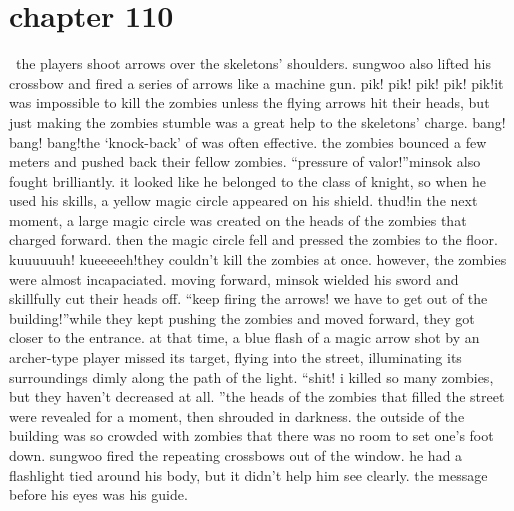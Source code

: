 \section{chapter 110}






 the players shoot arrows over the skeletons’ shoulders.
 sungwoo also lifted his crossbow and fired a series of arrows like a machine gun.
pik! pik! pik! pik! pik!it was impossible to kill the zombies unless the flying arrows hit their heads, but just making the zombies stumble was a great help to the skeletons’ charge.
bang! bang! bang!the ‘knock-back’ of  was often effective.
 the zombies bounced a few meters and pushed back their fellow zombies.
“pressure of valor!”minsok also fought brilliantly.
 it looked like he belonged to the class of knight, so when he used his skills, a yellow magic circle appeared on his shield.
thud!in the next moment, a large magic circle was created on the heads of the zombies that charged forward.
 then the magic circle fell and pressed the zombies to the floor.
kuuuuuuh! kueeeeeh!they couldn’t kill the zombies at once.
 however, the zombies were almost incapaciated.
 moving forward, minsok wielded his sword and skillfully cut their heads off.
“keep firing the arrows! we have to get out of the building!”while they kept pushing the zombies and moved forward, they got closer to the entrance.
at that time, a blue flash of a magic arrow shot by an archer-type player missed its target, flying into the street, illuminating its surroundings dimly along the path of the light.
“shit! i killed so many zombies, but they haven’t decreased at all.
”the heads of the zombies that filled the street were revealed for a moment, then shrouded in darkness.
 the outside of the building was so crowded with zombies that there was no room to set one’s foot down.
sungwoo fired the repeating crossbows out of the window.
 he had a flashlight tied around his body, but it didn’t help him see clearly.
 the message before his eyes was his guide.

